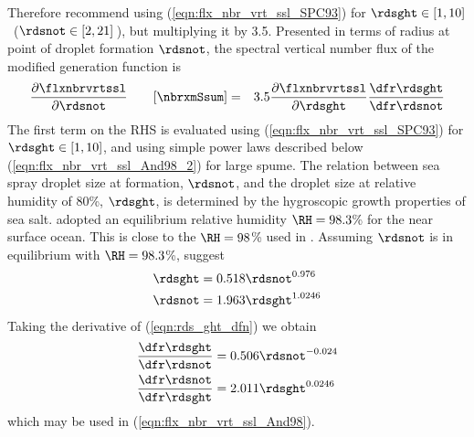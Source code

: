 \documentclass[12pt,twoside]{book}
\begin{document}
Therefore \cite{And98} recommend using
(\ref{eqn:flx_nbr_vrt_ssl_SPC93}) for $\rdsght \in [1,10]$\,\um 
($\rdsnot \in [2,21]$\,\um), but multiplying it by 3.5.
Presented in terms of radius at point of droplet formation $\rdsnot$,
the spectral vertical number flux of the modified \citeauthor{SPC93}
generation function is
\begin{eqnarray}
\frac{\partial \flxnbrvrtssl}{\partial \rdsnot} \qquad [\mbox{\nbrxmSsum}] & = &
3.5 \frac{\partial \flxnbrvrtssl}{\partial \rdsght}
\frac{\dfr \rdsght}{\dfr \rdsnot}
\label{eqn:flx_nbr_vrt_ssl_And98}
\end{eqnarray}
The first term on the RHS is evaluated using \cite{SPC93}
(\ref{eqn:flx_nbr_vrt_ssl_SPC93}) for $\rdsght \in [1,10]$, 
and using simple power laws described below
(\ref{eqn:flx_nbr_vrt_ssl_And98_2}) for large spume. 
The relation between sea spray droplet size at formation, $\rdsnot$,
and the droplet size at relative humidity of 80\%, $\rdsght$, is 
determined by the hygroscopic growth properties of sea salt.
\cite{SPC93} adopted an equilibrium relative humidity $\RH = 98.3$\% for 
the near surface ocean.
This is close to the $\RH = 98$\% used in \cite{LaP81}. 
Assuming $\rdsnot$ is in equilibrium with $\RH = 98.3$\%, \cite{And98}
suggest 
\begin{subequations}
\label{eqn:rds_ght_dfn}
\begin{align}
\rdsght & = 0.518 \rdsnot^{0.976} \\
\rdsnot & = 1.963 \rdsght^{1.0246}
\end{align}
\end{subequations}
Taking the derivative of (\ref{eqn:rds_ght_dfn}) we obtain
\begin{subequations}
\label{eqn:dfr_rds_ght_dfn}
\begin{align}
\frac{\dfr \rdsght}{\dfr \rdsnot} & = 0.506 \rdsnot^{-0.024} \\
\frac{\dfr \rdsnot}{\dfr \rdsght} & = 2.011 \rdsght^{0.0246}
\end{align}
\end{subequations}
which may be used in (\ref{eqn:flx_nbr_vrt_ssl_And98}).
\end{document}
